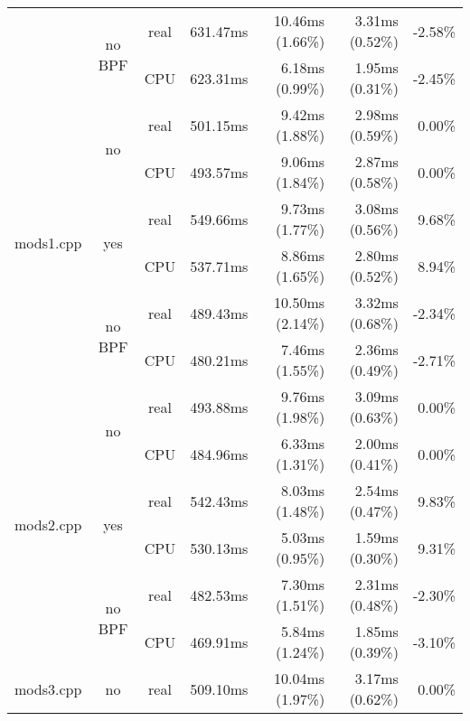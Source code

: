 \documentclass[en]{pracamgr}
\begin{document}
\begin{appendices}
\begin{small}
\begin{longtable}{|l|c|c|r|r|r|r|}
                            \cline{2-7}
                            & \multirow{2}{*}{no BPF} & real & 631.47ms & 10.46ms (1.66\%) & 3.31ms (0.52\%) & -2.58\% \\*
                            &                         & CPU  & 623.31ms & 6.18ms (0.99\%) & 1.95ms (0.31\%) & -2.45\% \\
\hline
\multirow{6}{*}{mods1.cpp}  & \multirow{2}{*}{no}     & real & 501.15ms & 9.42ms (1.88\%) & 2.98ms (0.59\%) & 0.00\% \\*
                            &                         & CPU  & 493.57ms & 9.06ms (1.84\%) & 2.87ms (0.58\%) & 0.00\% \\*
                            \cline{2-7}
                            & \multirow{2}{*}{yes}    & real & 549.66ms & 9.73ms (1.77\%) & 3.08ms (0.56\%) & 9.68\% \\*
                            &                         & CPU  & 537.71ms & 8.86ms (1.65\%) & 2.80ms (0.52\%) & 8.94\% \\*
                            \cline{2-7}
                            & \multirow{2}{*}{no BPF} & real & 489.43ms & 10.50ms (2.14\%) & 3.32ms (0.68\%) & -2.34\% \\*
                            &                         & CPU  & 480.21ms & 7.46ms (1.55\%) & 2.36ms (0.49\%) & -2.71\% \\
\hline
\multirow{6}{*}{mods2.cpp}  & \multirow{2}{*}{no}     & real & 493.88ms & 9.76ms (1.98\%) & 3.09ms (0.63\%) & 0.00\% \\*
                            &                         & CPU  & 484.96ms & 6.33ms (1.31\%) & 2.00ms (0.41\%) & 0.00\% \\*
                            \cline{2-7}
                            & \multirow{2}{*}{yes}    & real & 542.43ms & 8.03ms (1.48\%) & 2.54ms (0.47\%) & 9.83\% \\*
                            &                         & CPU  & 530.13ms & 5.03ms (0.95\%) & 1.59ms (0.30\%) & 9.31\% \\*
                            \cline{2-7}
                            & \multirow{2}{*}{no BPF} & real & 482.53ms & 7.30ms (1.51\%) & 2.31ms (0.48\%) & -2.30\% \\*
                            &                         & CPU  & 469.91ms & 5.84ms (1.24\%) & 1.85ms (0.39\%) & -3.10\% \\
\hline
\multirow{6}{*}{mods3.cpp}  & \multirow{2}{*}{no}     & real & 509.10ms & 10.04ms (1.97\%) & 3.17ms (0.62\%) & 0.00\% \\*

\end{longtable}
\end{small}
\end{appendices}
\end{document}
